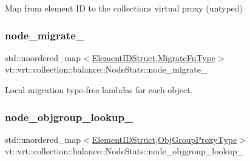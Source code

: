 Map from element ID to the collection\textquotesingle{}s virtual proxy (untyped) 

\mbox{\label{structvt_1_1vrt_1_1collection_1_1balance_1_1_node_stats_ab18ecce80362dfce22c3cd0c740c9810}} 
\subsubsection{\texorpdfstring{node\+\_\+migrate\+\_\+}{node\_migrate\_}}
{\footnotesize\ttfamily std\+::unordered\+\_\+map$<$\hyperlink{namespacevt_1_1vrt_1_1collection_1_1balance_a9f5b53fafb270212279a4757d2c4cd28}{Element\+I\+D\+Struct},\hyperlink{structvt_1_1vrt_1_1collection_1_1balance_1_1_node_stats_af702e521887d9015e33a7aedda48d09d}{Migrate\+Fn\+Type}$>$ vt\+::vrt\+::collection\+::balance\+::\+Node\+Stats\+::node\+\_\+migrate\+\_\+\hspace{0.3cm}{\ttfamily [private]}}



Local migration type-\/free lambdas for each object. 

\mbox{\label{structvt_1_1vrt_1_1collection_1_1balance_1_1_node_stats_a0333e2f4682c11110ec6b1a5a473e3d5}} 
\subsubsection{\texorpdfstring{node\+\_\+objgroup\+\_\+lookup\+\_\+}{node\_objgroup\_lookup\_}}
{\footnotesize\ttfamily std\+::unordered\+\_\+map$<$\hyperlink{namespacevt_1_1vrt_1_1collection_1_1balance_a9f5b53fafb270212279a4757d2c4cd28}{Element\+I\+D\+Struct},\hyperlink{namespacevt_ad7cae989df485fccca57f0792a880a8e}{Obj\+Group\+Proxy\+Type}$>$ vt\+::vrt\+::collection\+::balance\+::\+Node\+Stats\+::node\+\_\+objgroup\+\_\+lookup\+\_\+\hspace{0.3cm}{\ttfamily [private]}}



